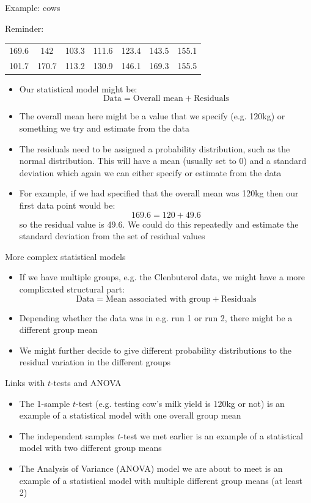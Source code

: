 \documentclass[12pt,xcolor=dvipsnames,handout,mathserif,aspectratio=169]{beamer}
\begin{document}
\begin{frame}{Example: cows}

Reminder:
\begin{tabular}{ccccccc}
169.6&142&103.3&111.6&123.4&143.5&155.1\\
101.7&170.7&113.2&130.9&146.1&169.3&155.5
\end{tabular}

\begin{itemize}
\item Our statistical model might be:
$$\mbox{Data} = \mbox{Overall mean} + \mbox{Residuals}$$
\item The overall mean here might be a value that we specify (e.g. 120kg) or something we try and estimate from the data
\item The residuals need to be assigned a probability distribution, such as the normal distribution. This will have a mean (usually set to 0) and a standard deviation which again we can either specify or estimate from the data
\item For example, if we had specified that the overall mean was 120kg then our first data point would be:
$$169.6 = 120 + 49.6$$
so the residual value is 49.6. We could do this repeatedly and estimate the standard deviation from the set of residual values
\end{itemize}
\end{frame}

\begin{frame}{More complex statistical models}

\begin{itemize}
\item If we have multiple groups, e.g. the Clenbuterol data, we might have a more complicated structural part:
$$\mbox{Data} = \mbox{Mean associated with group} + \mbox{Residuals}$$
\item Depending whether the data was in e.g. run 1 or run 2, there might be a different group mean 
\item We might further decide to give different probability distributions to the residual variation in the different groups
\end{itemize}
\end{frame}

\begin{frame}{Links with $t$-tests and ANOVA}

\begin{itemize}
\item The 1-sample $t$-test (e.g. testing cow's milk yield is 120kg or not) is an example of a statistical model with one overall group mean
\item The independent samples $t$-test we met earlier is an example of a statistical model with two different group means
\item The Analysis of Variance (ANOVA) model we are about to meet is an example of a statistical model with multiple different group means (at least 2)
\end{itemize}

\end{frame}
\end{document}
